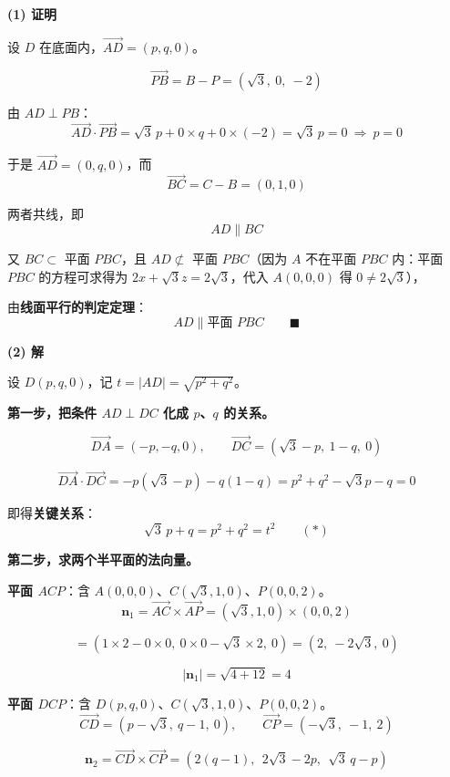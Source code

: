 \par\medskip

\textbf{(1) 证明}

设 $D$ 在底面内，$\overrightarrow{AD}=(p,q,0)$。

\[\overrightarrow{PB}=B-P=\left(\sqrt3,\ 0,\ -2\right)\]

由 $AD\perp PB$：
\[\overrightarrow{AD}\cdot\overrightarrow{PB}=\sqrt3\,p+0\times q+0\times(-2)=\sqrt3\,p=0\ \Longrightarrow\ p=0\]

于是 $\overrightarrow{AD}=(0,q,0)$，而
\[\overrightarrow{BC}=C-B=(0,1,0)\]

两者共线，即
\[AD\parallel BC\]

又 $BC\subset$ 平面 $PBC$，且 $AD\not\subset$ 平面 $PBC$（因为 $A$ 不在平面 $PBC$ 内：平面 $PBC$ 的方程可求得为 $2x+\sqrt3z=2\sqrt3$，代入 $A(0,0,0)$ 得 $0\ne2\sqrt3$），

由\textbf{线面平行的判定定理}：
\[AD\parallel\text{平面 }PBC\qquad\blacksquare\]

\par\medskip

\textbf{(2) 解}

设 $D(p,q,0)$，记 $t=|AD|=\sqrt{p^{2}+q^{2}}$。

\textbf{第一步，把条件 $AD\perp DC$ 化成 $p$、$q$ 的关系。}

\[\overrightarrow{DA}=(-p,-q,0),\qquad \overrightarrow{DC}=\left(\sqrt3-p,\ 1-q,\ 0\right)\]

\[\overrightarrow{DA}\cdot\overrightarrow{DC}=-p\left(\sqrt3-p\right)-q(1-q)=p^{2}+q^{2}-\sqrt3p-q=0\]

即得\textbf{关键关系}：
\[\boxed{\sqrt3\,p+q=p^{2}+q^{2}=t^{2}}\qquad(\ast)\]

\textbf{第二步，求两个半平面的法向量。}

\textbf{平面 $ACP$}：含 $A(0,0,0)$、$C\left(\sqrt3,1,0\right)$、$P(0,0,2)$。
\[\boldsymbol n_1=\overrightarrow{AC}\times\overrightarrow{AP}=\left(\sqrt3,1,0\right)\times(0,0,2)\]

\[=\left(1\times2-0\times0,\ 0\times0-\sqrt3\times2,\ 0\right)=\left(2,\ -2\sqrt3,\ 0\right)\]

\[\left|\boldsymbol n_1\right|=\sqrt{4+12}=4\]

\textbf{平面 $DCP$}：含 $D(p,q,0)$、$C\left(\sqrt3,1,0\right)$、$P(0,0,2)$。
\[\overrightarrow{CD}=\left(p-\sqrt3,\ q-1,\ 0\right),\qquad \overrightarrow{CP}=\left(-\sqrt3,\ -1,\ 2\right)\]

\[\boldsymbol n_2=\overrightarrow{CD}\times\overrightarrow{CP}=\left(2(q-1),\ \ 2\sqrt3-2p,\ \ \sqrt3\,q-p\right)\]

